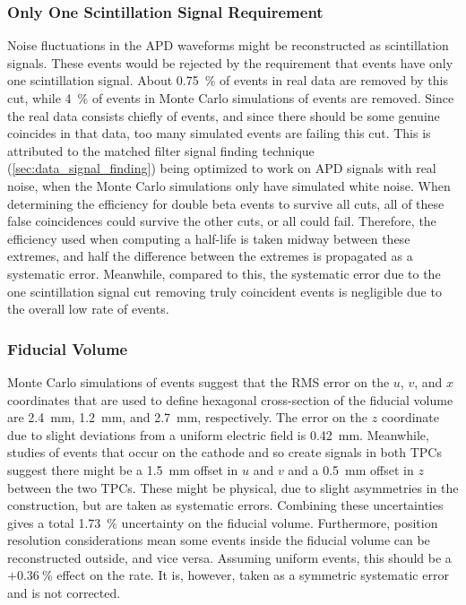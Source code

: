 \documentclass[herrin-thesis.tex]{subfiles}
\begin{document}
\subsubsection{Only One Scintillation Signal Requirement}
Noise fluctuations in the APD waveforms might be reconstructed as scintillation signals. These events would be rejected by the requirement that events have only one scintillation signal. About \SI{0.75}{\percent} of events in real data are removed by this cut, while \about{}\SI{4}{\percent} of events in Monte Carlo simulations of \twonu{} events are removed. Since the real data consists chiefly of \twonu{} events, and since there should be some genuine coincides in that data, too many simulated events are failing this cut. This is attributed to the matched filter signal finding technique (\cref{sec:data_signal_finding}) being optimized to work on APD signals with real noise, when the Monte Carlo simulations only have simulated white noise. When determining the efficiency for double beta events to survive all cuts, all of these false coincidences could survive the other cuts, or all could fail. Therefore, the efficiency used when computing a half-life is taken midway between these extremes, and half the difference between the extremes is propagated as a systematic error. Meanwhile, compared to this, the systematic error due to the one scintillation signal cut removing truly coincident events is negligible due to the overall low rate of events.

\subsubsection{Fiducial Volume}
Monte Carlo simulations of \twonu{} events suggest that the RMS error on the \(u\), \(v\), and \(x\) coordinates that are used to define hexagonal cross-section of the fiducial volume are \SI{2.4}{\mm}, \SI{1.2}{\mm}, and \SI{2.7}{\mm}, respectively. The error on the \(z\) coordinate due to slight deviations from a uniform electric field is \SI{0.42}{\mm}. Meanwhile, studies of events that occur on the cathode and so create signals in both TPCs suggest there might be a \SI{1.5}{\mm} offset in \(u\) and \(v\) and a \SI{0.5}{\mm} offset in \(z\) between the two TPCs. These might be physical, due to slight asymmetries in the construction, but are taken as systematic errors. Combining these uncertainties gives a total \SI{1.73}{\percent} uncertainty on the fiducial volume. Furthermore, position resolution considerations mean some events inside the fiducial volume can be reconstructed outside, and vice versa. Assuming uniform events, this should be a \(+\SI{0.36}{\percent}\) effect on the rate. It is, however, taken as a symmetric systematic error and is not corrected.
\end{document}
